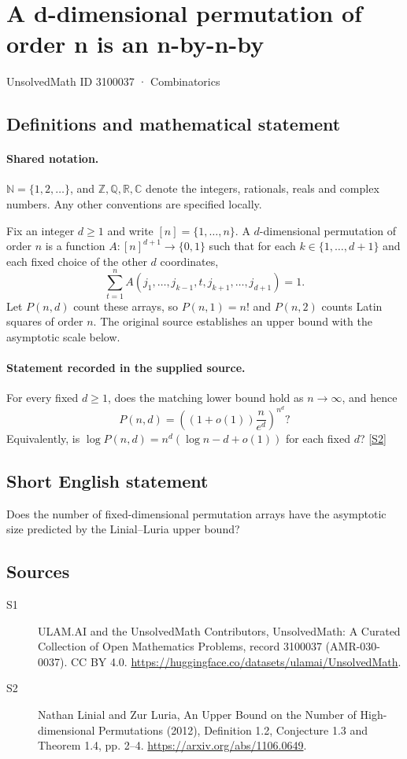 \documentclass[11pt]{article}
\newcommand{\sref}[2]{\hyperlink{source:#1:#2}{[S#2]}}
\begin{document}
\setcounter{section}{3100036}
\section{A d-dimensional permutation of order n is an n-by-n-by}\label{3100037}
{\small\sffamily UnsolvedMath ID 3100037 · Combinatorics}
\subsection{Definitions and mathematical statement}

\paragraph{Shared notation.}$\mathbb N=\{1,2,\ldots\}$, and $\mathbb Z,\mathbb Q,\mathbb R,\mathbb C$ denote the integers, rationals, reals and complex numbers. Any other conventions are specified locally.


Fix an integer $d\geq1$ and write $[n]=\{1,\ldots,n\}$. A $d$-dimensional permutation of order $n$ is a function $A:[n]^{d+1}\to\{0,1\}$ such that for each $k\in\{1,\ldots,d+1\}$ and each fixed choice of the other $d$ coordinates,
\[\sum_{t=1}^n A(j_1,\ldots,j_{k-1},t,j_{k+1},\ldots,j_{d+1})=1.\]
Let $P(n,d)$ count these arrays, so $P(n,1)=n!$ and $P(n,2)$ counts Latin squares of order $n$. The original source establishes an upper bound with the asymptotic scale below.
\paragraph{Statement recorded in the supplied source.}
For every fixed $d\geq1$, does the matching lower bound hold as $n\to\infty$, and hence
\[P(n,d)=\left((1+o(1))\frac{n}{e^d}\right)^{n^d}?\]
Equivalently, is $\log P(n,d)=n^d(\log n-d+o(1))$ for each fixed $d$? \sref{3100037}{2}
\subsection{Short English statement}
Does the number of fixed-dimensional permutation arrays have the asymptotic size predicted by the Linial--Luria upper bound?
\subsection{Sources}
\begin{description}
\item[\hypertarget{source:3100037:1}{S1}] ULAM.AI and the UnsolvedMath Contributors, UnsolvedMath: A Curated Collection of Open Mathematics Problems, record 3100037 (AMR-030-0037). CC BY 4.0. \url{https://huggingface.co/datasets/ulamai/UnsolvedMath}.
\item[\hypertarget{source:3100037:2}{S2}] Nathan Linial and Zur Luria, An Upper Bound on the Number of High-dimensional Permutations (2012), Definition 1.2, Conjecture 1.3 and Theorem 1.4, pp. 2--4. \url{https://arxiv.org/abs/1106.0649}.
\end{description}
\label{end:3100037}
\end{document}
